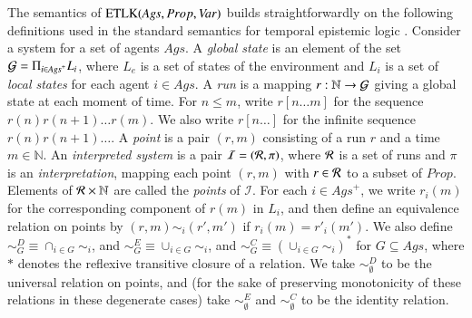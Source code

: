 \documentclass[a4wide]{article}
\newcommand{\R}{{\cal R}}
\newcommand{\Prop}{Prop}
\newcommand{\SVar}{V\!ar}
\newcommand{\nat}{\mathbb{N}}
\theoremstyle{examplesty}
\newcommand{\Ags}{\mathit{Ags}}
\newcommand{\Agse}{\mathit{Ags}^+}
\newcommand{\I}{\mathcal{I}}
\newcommand{\G}{{\cal G}}
\newcommand{\ETL}{{\rm ETLK}}
\begin{document}
The semantics of $\ETL(\Ags,  \Prop,\SVar)$ builds straightforwardly on 
the following definitions used 
in the standard semantics for temporal epistemic logic \cite{FHMVbook}. 
Consider a system for a set of agents $\Ags$. 
A {\em global state} is an element of the set 
$\G = \Pi_{i\in \Agse} L_i$, 
where  $L_e$ is a set of states of the environment and 
$L_i$ is a  set of {\em local states} for each agent $i\in \Ags$. 
A {\em run} is a mapping $r: \nat\rightarrow \G$ giving a global state at each moment of time. 
For $n \leq m$,   write $r[n\ldots m]$ for the sequence $r(n) r(n+1)  \ldots r(m)$. 
We also write $r[n\ldots]$ for the infinite sequence $r(n) r(n+1)  \ldots $. 
A {\em point} is a pair $(r,m)$ consisting of a run $r$ and a time 
$m\in \nat$.
An {\em interpreted system} is a pair $\I = (\R, \pi)$, where 
$\R$ is a set of runs and $\pi$ is an  {\em interpretation},  mapping each point $(r,m)$ with $r\in \R$ 
to a subset of  $\Prop$. 
Elements of $\R\times \nat$ are called the {\em points} of $\I$. 
For each 
$i\in \Agse$, 
we write $r_i(m)$ for the 
corresponding
component of $r(m)$ in $L_i$, and then
define an equivalence relation on points by $(r,m) \sim_i (r',m')$ if 
$r_i(m) = r'_i(m')$. 
We also define $\sim^D_G\equiv \cap_{i\in G}\sim_i$, and $\sim^E_G \equiv \cup_{i\in G} \sim_i$, and $\sim^C_G \equiv (\cup_{i\in G} \sim_i)^*$  for $G\subseteq \Ags$, 
where $*$ denotes the reflexive transitive closure of a relation. 
We take $\sim^D_\emptyset$ to be the universal relation on points, and 
(for the sake of preserving monotonicity of these relations in these degenerate cases) take 
$\sim^E_\emptyset$ and $\sim^C_\emptyset$ to be the 
identity relation. 
\end{document}

